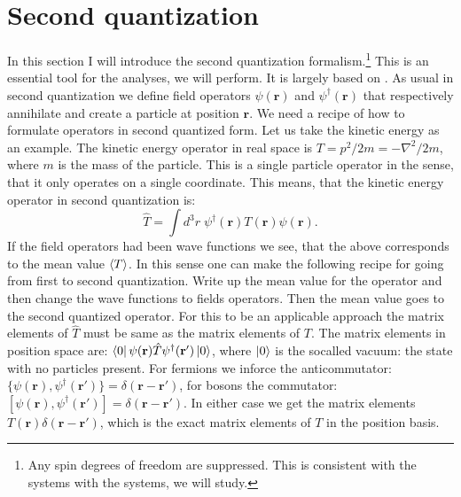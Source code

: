 \section{Second quantization} \label{sec.secondquantization}
In this section I will introduce the second quantization formalism.\footnote{Any spin degrees of freedom are suppressed. This is consistent with the systems with the systems, we will study.} This is an essential tool for the analyses, we will perform. It is largely based on \cite{LandauQM}. As usual in second quantization we define field operators $\psi(\mathbf{r})$ and $\psi^\dagger(\mathbf{r})$ that respectively annihilate and create a particle at position $\mathbf{r}$. We need a recipe of how to formulate operators in second quantized form. Let us take the kinetic energy as an example. The kinetic energy operator in real space is $T = p^2/2m = -\nabla^2/2m$, where $m$ is the mass of the particle. This is a single particle operator in the sense, that it only operates on a single coordinate. This means, that the kinetic energy operator in second quantization is:
\begin{equation}
\hat{T} = \int d^3 r \; \psi^\dagger(\mathbf{r}) T(\mathbf{r})\psi(\mathbf{r}). \nonumber   
\end{equation} 
If the field operators had been wave functions we see, that the above corresponds to the mean value $\braket{T}$. In this sense one can make the following recipe for going from first to second quantization. Write up the mean value for the operator and then change the wave functions to fields operators. Then the mean value goes to the second quantized operator. For this to be an applicable approach the matrix elements of $\hat{T}$ must be same as the matrix elements of $T$. The matrix elements in position space are: $\bra{0}\psi(\mathbf{r}) \hat{T} \psi^\dagger(\mathbf{r}')\ket{0}$, where $\ket{0}$ is the socalled vacuum: the state with no particles present. For fermions we inforce the anticommutator: $\{\psi(\mathbf{r}), \psi^\dagger(\mathbf{r}')\} = \delta(\mathbf{r}-\mathbf{r}')$, for bosons the commutator: $[\psi(\mathbf{r}), \psi^\dagger(\mathbf{r}')] = \delta(\mathbf{r}-\mathbf{r}')$. In either case we get the matrix elements $T(\mathbf{r})\delta(\mathbf{r}-\mathbf{r}')$, which is the exact matrix elements of $T$ in the position basis. 

